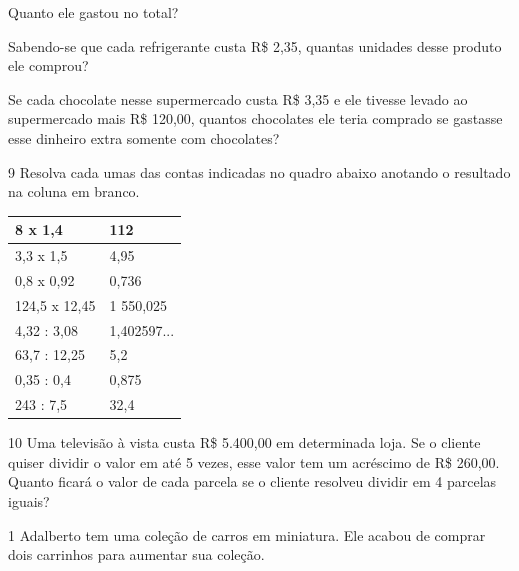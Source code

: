 \begin{escolha}
\item
  Quanto ele gastou no total?


\item
  Sabendo-se que cada refrigerante custa R\$ 2,35, quantas unidades
  desse produto ele comprou?


\item
  Se cada chocolate nesse supermercado custa R\$ 3,35 e ele tivesse
  levado ao supermercado mais R\$ 120,00, quantos chocolates ele teria
  comprado se gastasse esse dinheiro extra somente com chocolates?

\end{escolha}


\num{9} Resolva cada umas das contas indicadas no quadro abaixo anotando o
resultado na coluna em branco.

\begin{longtable}[]{@{}ll@{}}
\toprule
8 x 1,4 & 112\tabularnewline
\midrule
\endhead
3,3 x 1,5 & 4,95\tabularnewline
0,8 x 0,92 & 0,736\tabularnewline
124,5 x 12,45 & 1 550,025\tabularnewline
4,32 : 3,08 & 1,402597...\tabularnewline
63,7 : 12,25 & 5,2\tabularnewline
0,35 : 0,4 & 0,875\tabularnewline
243 : 7,5 & 32,4\tabularnewline
\bottomrule
\end{longtable}

\num{10} Uma televisão à vista custa R\$ 5.400,00 em determinada loja.
Se o cliente quiser dividir o valor em até 5 vezes, esse valor tem um
acréscimo de R\$ 260,00. Quanto ficará o valor de cada parcela se o
cliente resolveu dividir em 4 parcelas iguais?




\num{1} Adalberto tem uma coleção de carros em miniatura. Ele acabou de
comprar dois carrinhos para aumentar sua coleção.

